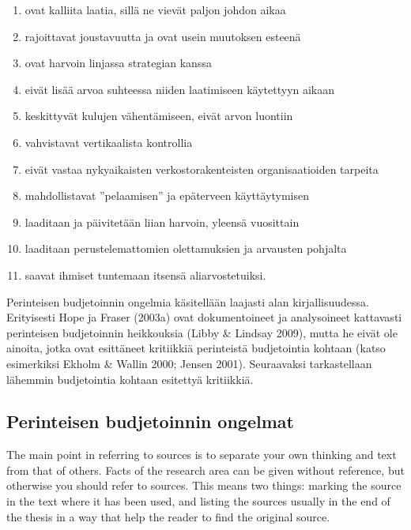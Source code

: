 \documentclass[12pt,a4paper,oneside,pdftex]{report}
\begin{document}
\begin{enumerate}
\setlength{\itemsep}{0pt}
\item ovat kalliita laatia, sillä ne vievät paljon johdon aikaa
\item rajoittavat joustavuutta ja ovat usein muutoksen esteenä
\item ovat harvoin linjassa strategian kanssa
\item eivät lisää arvoa suhteessa niiden laatimiseen käytettyyn aikaan
\item keskittyvät kulujen vähentämiseen, eivät arvon luontiin
\item vahvistavat vertikaalista kontrollia
\item eivät vastaa nykyaikaisten verkostorakenteisten organisaatioiden tarpeita
\item mahdollistavat ”pelaamisen” ja epäterveen käyttäytymisen
\item laaditaan ja päivitetään liian harvoin, yleensä vuosittain
\item laaditaan perustelemattomien olettamuksien ja arvausten pohjalta
\item saavat ihmiset tuntemaan itsensä aliarvostetuiksi.

\end{enumerate}

Perinteisen budjetoinnin ongelmia käsitellään laajasti alan kirjallisuudessa. Erityisesti Hope ja Fraser (2003a) ovat dokumentoineet ja analysoineet kattavasti perinteisen budjetoinnin heikkouksia (Libby & Lindsay 2009), mutta he eivät ole ainoita, jotka ovat esittäneet kritiikkiä perinteistä budjetointia kohtaan (katso esimerkiksi Ekholm & Wallin 2000; Jensen 2001). Seuraavaksi tarkastellaan lähemmin budjetointia kohtaan esitettyä kritiikkiä.

\subsection{Perinteisen budjetoinnin ongelmat}

The main point in referring to sources is to separate your own
thinking and text from that of others. Facts of the research area can
be given without reference, but otherwise you should refer to
sources. This means two things: marking the source in the text where
it has been used, and listing the sources usually in the end of the
thesis in a way that help the reader to find the original source.
\end{document}

